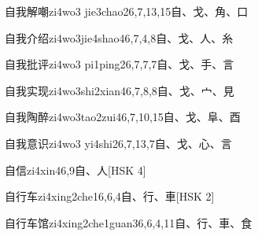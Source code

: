 \begin{EntryWithPhonetic}{自我解嘲}{zi4wo3 jie3chao2}{6,7,13,15}{⾃、⼽、⾓、⼝}
\end{EntryWithPhonetic}

\begin{EntryWithPhonetic}{自我介绍}{zi4wo3jie4shao4}{6,7,4,8}{⾃、⼽、⼈、⽷}
\end{EntryWithPhonetic}

\begin{EntryWithPhonetic}{自我批评}{zi4wo3 pi1ping2}{6,7,7,7}{⾃、⼽、⼿、⾔}
\end{EntryWithPhonetic}

\begin{EntryWithPhonetic}{自我实现}{zi4wo3shi2xian4}{6,7,8,8}{⾃、⼽、⼧、⾒}
\end{EntryWithPhonetic}

\begin{EntryWithPhonetic}{自我陶醉}{zi4wo3tao2zui4}{6,7,10,15}{⾃、⼽、⾩、⾣}
\end{EntryWithPhonetic}

\begin{EntryWithPhonetic}{自我意识}{zi4wo3 yi4shi2}{6,7,13,7}{⾃、⼽、⼼、⾔}
\end{EntryWithPhonetic}

\begin{EntryWithPhonetic}{自信}{zi4xin4}{6,9}{⾃、⼈}[HSK 4]
\end{EntryWithPhonetic}

\begin{EntryWithPhonetic}{自行车}{zi4xing2che1}{6,6,4}{⾃、⾏、⾞}[HSK 2]
\end{EntryWithPhonetic}

\begin{EntryWithPhonetic}{自行车馆}{zi4xing2che1guan3}{6,6,4,11}{⾃、⾏、⾞、⾷}
\end{EntryWithPhonetic}

